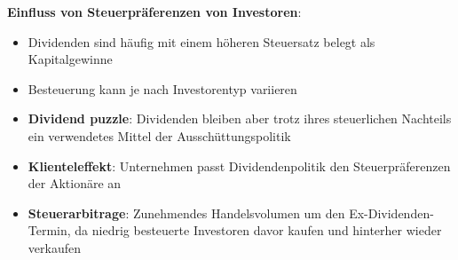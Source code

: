 \bigskip
\textbf{Einfluss von Steuerpräferenzen von Investoren}:
\begin{itemize}
	\item Dividenden sind häufig mit einem höheren Steuersatz belegt als Kapitalgewinne
	\item Besteuerung kann je nach Investorentyp variieren
	\item \textbf{Dividend puzzle}: Dividenden bleiben aber trotz ihres steuerlichen Nachteils ein verwendetes Mittel der Ausschüttungspolitik
	\item \textbf{Klienteleffekt}: Unternehmen passt Dividendenpolitik den Steuerpräferenzen der Aktionäre an
	\item \textbf{Steuerarbitrage}: Zunehmendes Handelsvolumen um den Ex-Dividenden-Termin, da niedrig besteuerte Investoren davor kaufen und hinterher wieder verkaufen
\end{itemize}